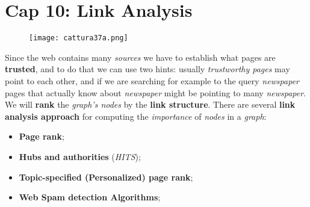 \documentclass{article}
\begin{document}
\section{Cap 10: Link Analysis}
\begin{figure}[H]
  \centering
  \texttt{[image: cattura37a.png]}
\end{figure}
Since the web contains many \emph{sources} we have to establish what pages are \textbf{trusted}, and to do that we can use two hints: usually \emph{trustworthy pages} may point to each other, and if we are searching for example to the query \emph{newspaper} pages that actually know about \emph{newspaper} might be pointing to many \emph{newspaper}. We will \textbf{rank} the \emph{graph's nodes} by the \textbf{link structure}. There are several \textbf{link analysis approach} for computing the \emph{importance} of \emph{nodes} in a \emph{graph}:
\begin{itemize}
\item \textbf{Page rank};
\item \textbf{Hubs and authorities} (\emph{HITS});
\item \textbf{Topic-specified (Personalized) page rank};
\item\textbf{ Web Spam detection Algorithms};
\end{itemize} 
\end{document}

